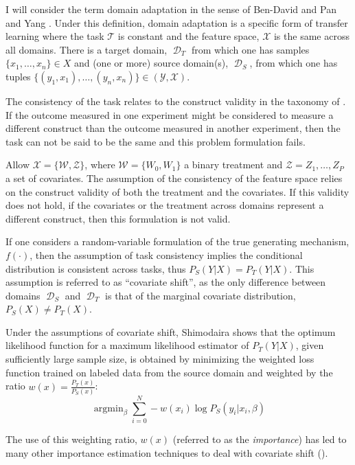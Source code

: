 \documentclass[a4paper,12pt]{article}
\DeclareMathOperator*{\argmin}{argmin}
\DeclareMathOperator*{\D}{\mathcal{D}}
\begin{document}
I will consider the term domain adaptation in the sense of Ben-David \parencite*{Ben-David2006} and Pan and Yang \parencite*{Pan2010}. Under this definition, domain adaptation is a specific form of transfer learning where the task $\mathcal{T}$ is constant and the feature space, $\mathcal{X}$ is the same across all domains. There is a target domain, $\D_T$ from which one has samples $\{x_1,\ldots,x_n\} \in X$ and (one or more) source domain(s), $\D_S$, from which one has tuples $\{(y_1, x_1),\dots,(y_n, x_n)\} \in (\mathcal{Y}, \mathcal{X})$.

The consistency of the task relates to the construct validity in the taxonomy of \cite{Shadish2002}. If the outcome measured in one experiment might be considered to measure a different construct than the outcome measured in another experiment, then the task can not be said to be the same and this problem formulation fails.

Allow $\mathcal{X} = \{\mathcal{W}, \mathcal{Z}\}$, where $\mathcal{W} = \{W_0, W_1\}$ a binary treatment and $\mathcal{Z} = {Z_1,\ldots,Z_P}$ a set of covariates. The assumption of the consistency of the feature space relies on the construct validity of both the treatment and the covariates. If this validity does not hold, if the covariates or the treatment across domains represent a different construct, then this formulation is not valid.

If one considers a random-variable formulation of the true generating mechanism, $f(\cdot)$, then the assumption of task consistency implies the conditional distribution is consistent across tasks, thus $P_S(Y | X) = P_T(Y | X)$. This assumption is referred to as ``covariate shift'', as the only difference between domains $\D_S$ and $\D_T$ is that of the marginal covariate distribution, $P_S(X) \neq P_T(X)$.

Under the assumptions of covariate shift, Shimodaira \parencite*{Shimodaira2000} shows that the optimum likelihood function for a maximum likelihood estimator of $P_T(Y | X)$, given sufficiently large sample size, is obtained by minimizing the weighted loss function trained on labeled data from the source domain and weighted by the ratio $w(x) = \frac{P_T(x)}{P_S(x)}$:
%
$$
\argmin_{\beta} \sum_{i=0}^N -w(x_i) \log P_S(y_i | x_i, \beta)
$$

The use of this weighting ratio, $w(x)$ (referred to as the \textit{importance}) has led to many other importance estimation techniques to deal with covariate shift (\cite{Suigyama2007, Pan2010}).
\end{document}
